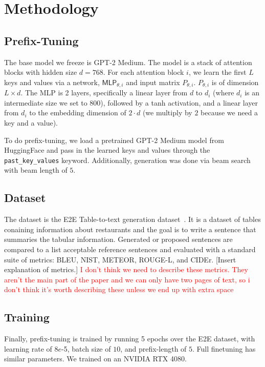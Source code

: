 \documentclass[11pt]{article} %
\begin{document}
\section{Methodology}

\subsection{Prefix-Tuning}
The base model we freeze is GPT-2 Medium. The model is a stack of attention blocks with hidden size $d=768$. For each attention block $i$, we learn the first $L$ keys and values via a network, $\textsf{MLP}_{\theta,i}$ and input matrix $P_{\theta,i}$. $P_{\theta,i}$ is of dimension $L\times d$. The MLP is 2 layers, specifically a linear layer from $d$ to $d_i$ (where $d_i$ is an intermediate size we set to 800), followed by a tanh activation, and a linear layer from $d_i$ to the embedding dimension of $2\cdot d$ (we multiply by $2$ because we need a key and a value).

To do prefix-tuning, we load a pretrained GPT-2 Medium model from HuggingFace and pass in the learned keys and values through the \verb|past_key_values| keyword. Additionally, generation was done via beam search with beam length of $5$.

\subsection{Dataset}
The dataset is the E2E Table-to-text generation dataset~\cite{novikova-etal-2017-e2e}. It is a dataset of tables conaining information about restaurants and the goal is to write a sentence that summaries the tabular information. Generated or proposed sentences are compared to a list acceptable reference sentences and evaluated with a standard suite of metrics: BLEU, NIST, METEOR, ROUGE-L, and CIDEr. [Insert explanation of metrics.]
\textcolor{red}{I don't think we need to describe these metrics. They aren't the main part of the paper and we can only have two pages of text, so i don't think it's worth describing these unless we end up with extra space}

\subsection{Training}
Finally, prefix-tuning is trained by running 5 epochs over the E2E dataset, with learning rate of $8e$-5, batch size of $10$, and prefix-length of $5$. Full finetuning has similar parameters. We trained on an NVIDIA RTX 4080.
\end{document}

